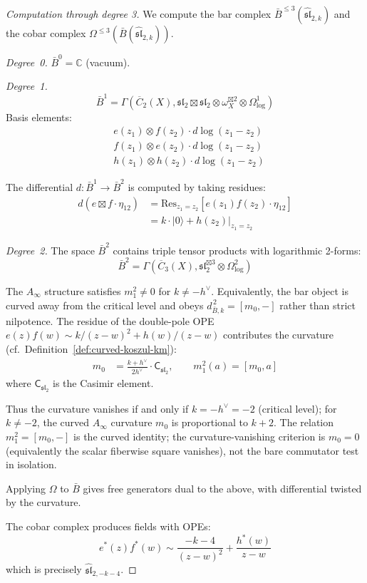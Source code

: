 \begin{proof}[Computation through degree 3]
We compute the bar complex $\bar{B}^{\leq 3}(\widehat{\mathfrak{sl}}_{2,k})$ and the cobar complex $\Omega^{\leq 3}(\bar{B}(\widehat{\mathfrak{sl}}_{2,k}))$.

\emph{Degree~0.} $\bar{B}^0 = \mathbb{C}$ (vacuum).

\emph{Degree~1.}
\begin{equation}
\bar{B}^1 = \Gamma(\overline{C}_2(X), \mathfrak{sl}_2 \boxtimes \mathfrak{sl}_2 \otimes \omega_X^{\boxtimes 2} \otimes \Omega^1_{\log})
\end{equation}
Basis elements:
\begin{align}
&e(z_1) \otimes f(z_2) \cdot d\log(z_1-z_2) \\
&f(z_1) \otimes e(z_2) \cdot d\log(z_1-z_2) \\
&h(z_1) \otimes h(z_2) \cdot d\log(z_1-z_2)
\end{align}

The differential $d: \bar{B}^1 \to \bar{B}^2$ is computed by taking residues:
\begin{align}
d(e \boxtimes f \cdot \eta_{12}) &= \mathrm{Res}_{z_1=z_2}[e(z_1)f(z_2) \cdot \eta_{12}] \\
&= k \cdot |0\rangle + h(z_2)|_{z_1=z_2}
\end{align}

\emph{Degree~2.}
The space $\bar{B}^2$ contains triple tensor products with logarithmic 2-forms:
\begin{equation}
\bar{B}^2 = \Gamma(\overline{C}_3(X), \mathfrak{sl}_2^{\boxtimes 3} \otimes \Omega^2_{\log})
\end{equation}

The $A_\infty$ structure satisfies $m_1^2 \neq 0$ for
$k\neq -h^\vee$. Equivalently, the bar object is curved away from
the critical level and obeys $d_{\bar B,k}^{\,2}=[m_0,-]$ rather
than strict nilpotence. The residue of the double-pole OPE
$e(z)f(w) \sim k/(z-w)^2 + h(w)/(z-w)$ contributes the curvature
(cf.\ Definition~\ref{def:curved-koszul-km}):
\begin{align}
m_0 &= \frac{k + h^\vee}{2h^\vee} \cdot \mathsf C_{\mathfrak{sl}_2},
\qquad m_1^2(a) = [m_0, a]
\end{align}
where $\mathsf C_{\mathfrak{sl}_2}$ is the Casimir element.

Thus the curvature vanishes if and only if
$k = -h^\vee = -2$ (critical level); for $k \neq -2$, the curved
$A_\infty$ curvature $m_0$ is proportional to $k+2$. The relation
$m_1^2=[m_0,-]$ is the curved identity; the curvature-vanishing
criterion is $m_0=0$ (equivalently the scalar fiberwise square
vanishes), not the bare commutator test in isolation.

Applying $\Omega$ to $\bar{B}$ gives free generators dual to the above, with differential twisted by the curvature.

The cobar complex produces fields with OPEs:
\begin{equation}
e^*(z) f^*(w) \sim \frac{-k-4}{(z-w)^2} + \frac{h^*(w)}{z-w}
\end{equation}
which is precisely $\widehat{\mathfrak{sl}}_{2,-k-4}$.
\end{proof}

